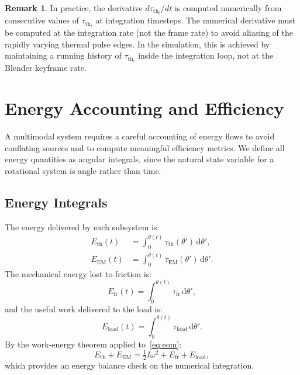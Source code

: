 \documentclass[11pt, a4paper]{article}
\theoremstyle{plain}
\theoremstyle{definition}
\newtheorem{remark}[theorem]{Remark}
\newcommand{\tauEM}{\tau_{\mathrm{EM}}}
\newcommand{\tauth}{\tau_{\mathrm{th}}}
\newcommand{\taufr}{\tau_{\mathrm{fr}}}
\newcommand{\tauload}{\tau_{\mathrm{load}}}
\newcommand{\Ethermal}{E_{\mathrm{th}}}
\newcommand{\EEM}{E_{\mathrm{EM}}}
\newcommand{\Eload}{E_{\mathrm{load}}}
\newcommand{\KE}{\tfrac{1}{2}I\omega^{2}}
\begin{document}
\begin{remark}
In practice, the derivative $d\tauth_i/dt$ is computed numerically from consecutive values of $\tauth_i$ at integration timesteps. The numerical derivative must be computed at the integration rate (not the frame rate) to avoid aliasing of the rapidly varying thermal pulse edges. In the simulation, this is achieved by maintaining a running history of $\tauth_i$ inside the integration loop, not at the Blender keyframe rate.
\end{remark}

\section{Energy Accounting and Efficiency}
\label{sec:energy}

A multimodal system requires a careful accounting of energy flows to avoid conflating sources and to compute meaningful efficiency metrics. We define all energy quantities as angular integrals, since the natural state variable for a rotational system is angle rather than time.

\subsection{Energy Integrals}

The energy delivered by each subsystem is:
\begin{align}
  \Ethermal(t) &= \int_0^{\theta(t)} \tauth(\theta')\, \mathrm{d}\theta', \label{eq:Eth}\\
  \EEM(t)      &= \int_0^{\theta(t)} \tauEM(\theta')\, \mathrm{d}\theta'. \label{eq:Eem}
\end{align}
The mechanical energy lost to friction is:
\begin{equation}
  E_{\mathrm{fr}}(t) = \int_0^{\theta(t)} \taufr\, \mathrm{d}\theta',
\end{equation}
and the useful work delivered to the load is:
\begin{equation}
  \Eload(t) = \int_0^{\theta(t)} \tauload\, \mathrm{d}\theta'.
\end{equation}
By the work-energy theorem applied to~\eqref{eq:eom}:
\begin{equation}
  \Ethermal + \EEM = \KE + E_{\mathrm{fr}} + \Eload,
\end{equation}
which provides an energy balance check on the numerical integration.
\end{document}
